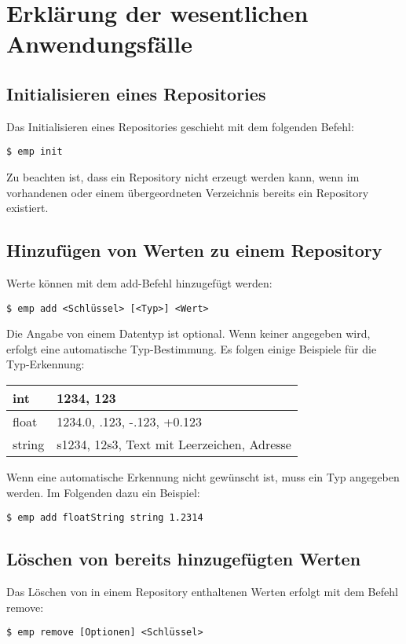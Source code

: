 

\section{Erklärung der wesentlichen Anwendungsfälle}

\subsection{Initialisieren eines Repositories}
Das Initialisieren eines Repositories geschieht mit dem folgenden Befehl:
\begin{lstlisting}[style=Bash]
$ emp init
\end{lstlisting}
Zu beachten ist, dass ein Repository nicht erzeugt werden kann, wenn im vorhandenen oder einem übergeordneten Verzeichnis bereits ein Repository existiert.

\subsection{Hinzufügen von Werten zu einem Repository}
Werte können mit dem add-Befehl hinzugefügt werden:
\begin{lstlisting}[style=Bash]
$ emp add <Schlüssel> [<Typ>] <Wert>
\end{lstlisting}
Die Angabe von einem Datentyp ist optional. Wenn keiner angegeben wird, erfolgt eine automatische Typ-Bestimmung.
Es folgen einige Beispiele für die Typ-Erkennung:

\begin{tabular}{| l | l |}
	\hline
	int & 1234, 123 \\
	\hline
	float & 1234.0, .123, -.123, +0.123 \\
	\hline
	string & s1234, 12s3, \grqq Text mit Leerzeichen\grqq , Adresse \\
	\hline
\end{tabular} 

Wenn eine automatische Erkennung nicht gewünscht ist, muss ein Typ angegeben werden. Im Folgenden dazu ein Beispiel:
\begin{lstlisting}[style=Bash]
$ emp add floatString string 1.2314
\end{lstlisting}

\subsection{Löschen von bereits hinzugefügten Werten}
Das Löschen von in einem Repository enthaltenen Werten erfolgt mit dem Befehl remove:
\begin{lstlisting}[style=Bash]
$ emp remove [Optionen] <Schlüssel>
\end{lstlisting}

